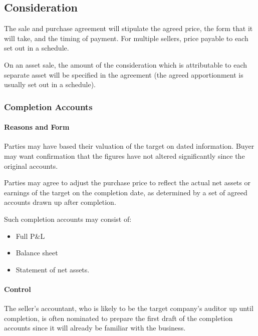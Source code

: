 \documentclass[
]{article}
\providecommand{\tightlist}{%
  \setlength{\itemsep}{0pt}\setlength{\parskip}{0pt}}
\begin{document}
\hypertarget{consideration}{%
\subsection{Consideration}\label{consideration}}

The sale and purchase agreement will stipulate the agreed price, the
form that it will take, and the timing of payment. For multiple sellers,
price payable to each set out in a schedule.

On an asset sale, the amount of the consideration which is attributable
to each separate asset will be specified in the agreement (the agreed
apportionment is usually set out in a schedule).

\hypertarget{completion-accounts}{%
\subsubsection{Completion Accounts}\label{completion-accounts}}

\hypertarget{reasons-and-form}{%
\paragraph{Reasons and Form}\label{reasons-and-form}}

Parties may have based their valuation of the target on dated
information. Buyer may want confirmation that the figures have not
altered significantly since the original accounts.

Parties may agree to adjust the purchase price to reflect the actual net
assets or earnings of the target on the completion date, as determined
by a set of agreed accounts drawn up after completion.

Such completion accounts may consist of:

\begin{itemize}
\tightlist
\item
  Full P\&L
\item
  Balance sheet
\item
  Statement of net assets.
\end{itemize}

\hypertarget{control}{%
\paragraph{Control}\label{control}}

The seller's accountant, who is likely to be the target company's
auditor up until completion, is often nominated to prepare the first
draft of the completion accounts since it will already be familiar with
the business.
\end{document}
